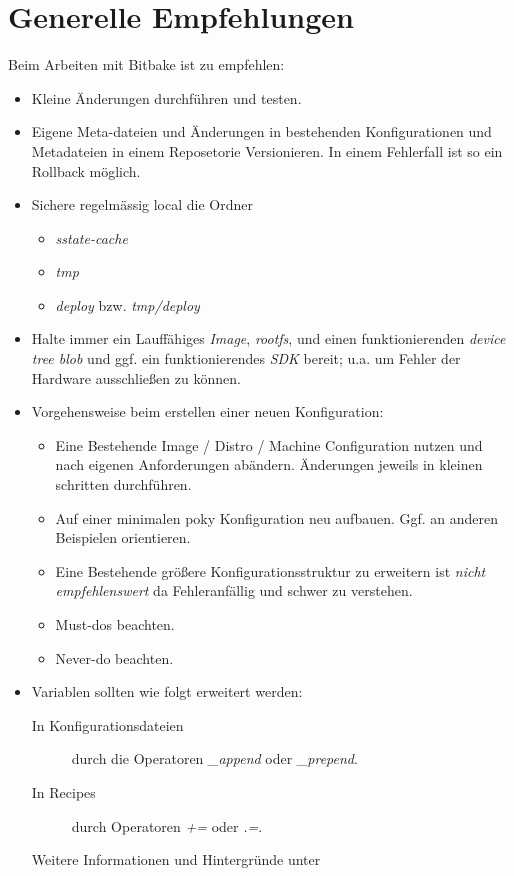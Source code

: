 \section{Generelle Empfehlungen}%
\label{sec:generelle_empfehlungen}

Beim Arbeiten mit Bitbake ist zu empfehlen:

\begin{itemize}
    \item Kleine Änderungen durchführen und testen.
    \item Eigene Meta-dateien und Änderungen in bestehenden Konfigurationen und
        Metadateien in einem Reposetorie Versionieren. In einem Fehlerfall ist
        so ein Rollback möglich.
    \item Sichere regelmässig local die Ordner
       \begin{itemize}
           \item \textit{sstate-cache}
           \item \textit{tmp}
           \item \textit{deploy} bzw. \textit{tmp/deploy}
       \end{itemize}
    \item Halte immer ein Lauffähiges \textit{Image}, \textit{rootfs},
    und einen funktionierenden
    \textit{device tree blob} und ggf. ein funktionierendes \textit{SDK}
    bereit; u.a. um  Fehler der Hardware ausschließen zu können.
    \item Vorgehensweise beim erstellen einer neuen Konfiguration:
        \begin{itemize}
            \item Eine Bestehende Image / Distro / Machine Configuration
                nutzen und nach eigenen Anforderungen abändern. Änderungen
                jeweils in kleinen schritten durchführen.
            \item Auf einer minimalen poky Konfiguration neu aufbauen. Ggf. an
                anderen Beispielen orientieren.
            \item Eine Bestehende größere Konfigurationsstruktur zu erweitern
                ist \textit{nicht empfehlenswert} da Fehleranfällig und schwer
                zu verstehen.
            \item Must-dos  beachten.
            \item Never-do  beachten.
        \end{itemize}
    \item Variablen sollten wie folgt erweitert werden:
        \begin{description}
            \item[In Konfigurationsdateien] durch die Operatoren \textit{\_append}
                oder \textit{\_prepend}.
            \item[In Recipes] durch Operatoren \textit{+=}
                oder \textit{.=}.
            \item[Weitere Informationen und Hintergründe unter] \cite[Seite
                160]{Gonzalez2018:Embedded_Linux_Development_Using_Yocto_Project_Cookbook_2nd}
        \end{description}
\end{itemize}



